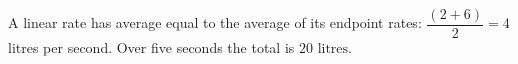 A linear rate has average equal to the average of its endpoint rates: $\dfrac{(2+6)}{2}=4$ litres per second. Over five seconds the total is $\boxed{20\text{ litres}}$.
